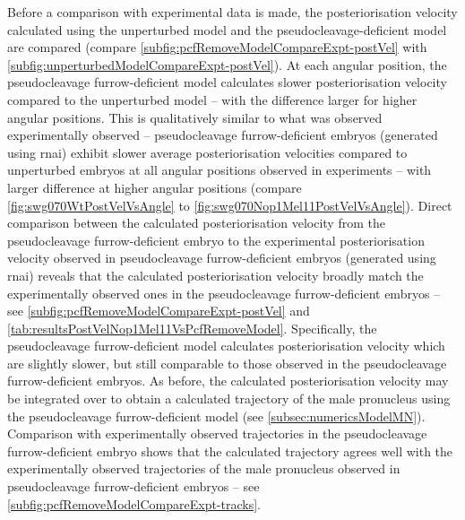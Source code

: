Before a comparison with experimental data is made, the posteriorisation velocity calculated using the unperturbed model and the pseudocleavage-deficient model are compared (compare \autoref{subfig:pcfRemoveModelCompareExpt-postVel} with \autoref{subfig:unperturbedModelCompareExpt-postVel}). At each angular position, the pseudocleavage furrow-deficient model calculates slower posteriorisation velocity compared to the unperturbed model -- with the difference larger for higher angular positions. This is qualitatively similar to what was observed experimentally observed -- pseudocleavage furrow-deficient embryos (generated using  \ac{rnai}) exhibit slower average posteriorisation velocities compared to unperturbed embryos at all angular positions observed in experiments -- with larger difference at higher angular positions (compare \autoref{fig:swg070WtPostVelVsAngle} to \autoref{fig:swg070Nop1Mel11PostVelVsAngle}). Direct comparison between the calculated posteriorisation velocity from the pseudocleavage furrow-deficient embryo to the experimental posteriorisation velocity observed in pseudocleavage furrow-deficient embryos (generated using  \ac{rnai}) reveals that the calculated posteriorisation velocity broadly match the experimentally observed ones in the pseudocleavage furrow-deficient embryos -- see \autoref{subfig:pcfRemoveModelCompareExpt-postVel} and \autoref{tab:resultsPostVelNop1Mel11VsPcfRemoveModel}. Specifically, the pseudocleavage furrow-deficient model calculates posteriorisation velocity which are slightly slower, but still comparable to those observed in the pseudocleavage furrow-deficient embryos. As before, the calculated posteriorisation velocity may be integrated over to obtain a calculated trajectory of the male pronucleus using the pseudocleavage furrow-deficient model (see \autoref{subsec:numericsModelMN}). Comparison with experimentally observed trajectories in the pseudocleavage furrow-deficient embryo shows that the calculated trajectory agrees well with the experimentally observed trajectories of the male pronucleus observed in pseudocleavage furrow-deficient embryos -- see \autoref{subfig:pcfRemoveModelCompareExpt-tracks}.

